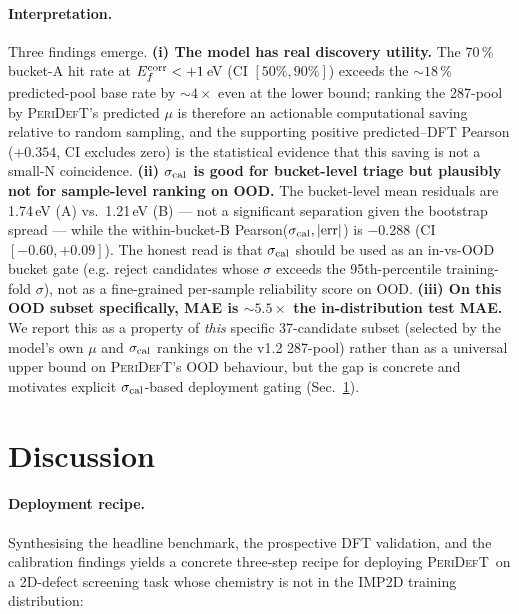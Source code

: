 \documentclass[11pt,a4paper]{article}
\newcommand{\modelname}{\textsc{PeriDefT}}
\begin{document}
\paragraph{Interpretation.}
Three findings emerge.
\textbf{(i) The model has real discovery utility.} The 70\,\%
bucket-A hit rate at $E_f^{\rm corr}<+1$\,eV (CI $[50\%, 90\%]$)
exceeds the $\sim 18$\,\% predicted-pool base rate by $\sim 4\times$
even at the lower bound; ranking the 287-pool by \modelname's
predicted $\mu$ is therefore an actionable computational saving
relative to random sampling, and the supporting positive
predicted--DFT Pearson ($+0.354$, CI excludes zero) is the
statistical evidence that this saving is not a small-N coincidence.
\textbf{(ii) $\sigma_{\rm cal}$ is good for bucket-level triage but
plausibly not for sample-level ranking on OOD.} The bucket-level
mean residuals are 1.74\,eV (A) vs.\ 1.21\,eV (B) --- not a
significant separation given the bootstrap spread --- while the
within-bucket-B Pearson($\sigma_{\rm cal}, |\mathrm{err}|$) is
$-0.288$ (CI $[-0.60, +0.09]$). The honest read is that
$\sigma_{\rm cal}$ should be used as an in-vs-OOD bucket gate (e.g.
reject candidates whose $\sigma$ exceeds the 95th-percentile
training-fold $\sigma$), not as a fine-grained per-sample
reliability score on OOD.
\textbf{(iii) On this OOD subset specifically, MAE is
$\sim 5.5\times$ the in-distribution test MAE.} We report this as
a property of \emph{this} specific 37-candidate subset (selected by
the model's own $\mu$ and $\sigma_{\rm cal}$ rankings on the v1.2
287-pool) rather than as a universal upper bound on \modelname's
OOD behaviour, but the gap is concrete and motivates explicit
$\sigma_{\rm cal}$-based deployment gating (Sec.~\ref{sec:disc_short}).

\section{Discussion}\label{sec:disc_short}

\paragraph{Deployment recipe.}
Synthesising the headline benchmark, the prospective DFT validation,
and the calibration findings yields a concrete three-step recipe
for deploying \modelname\ on a 2D-defect screening task whose
chemistry is not in the IMP2D training distribution:
\end{document}

